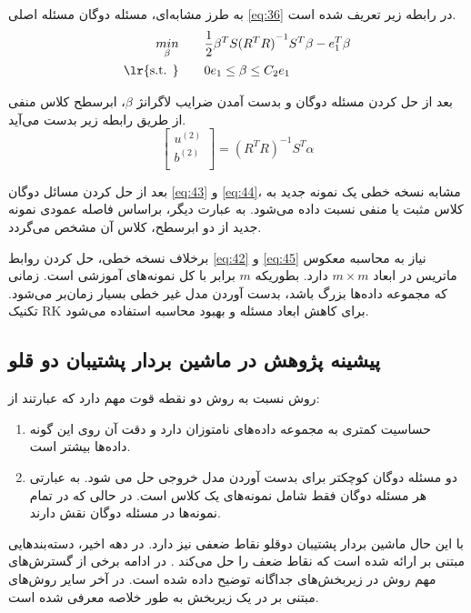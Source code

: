 به طرز مشابه‌ای، مسئله دوگان مسئله اصلی \ref{eq:36} در رابطه زیر تعریف شده است.
\begin{equation}
\begin{split}
\mathop{{ min}}\limits_{\beta} \qquad & \frac{1}{2}{{\beta }^{T}}S{{({{R}^{T}}R)}^{-1}}{{S}^{T}}\beta -e_{1}^{T}\beta  \\
\textrm{\lr{s.t. }} \qquad & 0{{e}_{1}}\le \beta \le {{C}_{2}}{{e}_{1}}
\end{split}
\label{eq:44}
\end{equation}

بعد از حل کردن مسئله دوگان و بدست آمدن ضرایب لاگرانژ $\beta$، ابرسطح کلاس منفی از طریق رابطه زیر بدست می‌آید.
\begin{equation}
\left[ \begin{matrix}
{{u}^{(2)}} \\
{{b}^{(2)}} \\
\end{matrix}\right]= {{({{R}^{T}}R)}^{-1}}{{S}^{T}}\alpha
\label{eq:45}
\end{equation}

بعد از حل کردن مسائل دوگان \ref{eq:43} و \ref{eq:44}، مشابه نسخه خطی یک نمونه جدید به کلاس مثبت یا منفی نسبت داده می‌شود. به عبارت دیگر، براساس فاصله عمودی نمونه جدید از دو ابرسطح، کلاس آن مشخص می‌گردد. 

برخلاف نسخه خطی، حل کردن روابط \ref{eq:42} و \ref{eq:45} نیاز به محاسبه معکوس ماتریس در ابعاد  $m  \times m$  دارد. بطوریکه  $m$ برابر با کل نمونه‌های آموزشی است. زمانی که مجموعه داده‌ها بزرگ باشد، بدست آوردن مدل غیر خطی بسیار زمان‌بر می‌شود. تکنیک \gls{RK} \cite{mang2001} برای کاهش ابعاد مسئله و بهبود محاسبه استفاده می‌شود.

\subsection{پیشینه پژوهش در ماشین بردار پشتیبان دو قلو}\label{sec:2:2:3}
روش  نسبت به روش  دو نقطه قوت مهم دارد که عبارتند از:
\begin{enumerate}
	\item 	حساسیت کمتری به مجموعه داده‌های نامتوزان دارد و دقت آن روی این گونه داده‌ها بیشتر است.
	\item دو مسئله دوگان کوچکتر برای بدست آوردن مدل خروجی حل می شود. به عبارتی هر مسئله دوگان فقط شامل نمونه‌های یک کلاس است. در حالی که در  تمام نمونه‌ها در مسئله دوگان نقش دارند.
\end{enumerate}

با این حال ماشین بردار پشتیبان دوقلو نقاط ضعفی نیز دارد. در دهه اخیر، دسته‌بند‌هایی مبتنی بر  ارائه شده است که نقاط ضعف  را حل می‌کند \cite{ding2014,ding2017,huang2018}. در ادامه برخی از گسترش‌های مهم روش  در زیربخش‌های جداگانه توضیح داده شده است. در آخر سایر روش‌های مبتنی بر  در یک زیربخش به طور خلاصه معرفی شده است.

